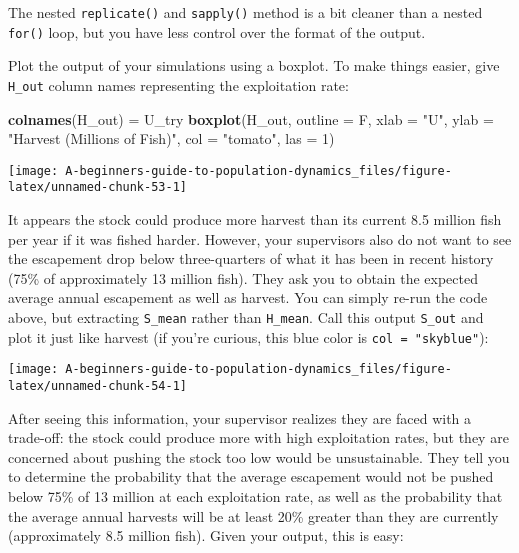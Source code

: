 \documentclass[]{book}
\newenvironment{Shaded}{\begin{snugshade}}{\end{snugshade}}
\newcommand{\DataTypeTok}[1]{\textcolor[rgb]{0.13,0.29,0.53}{#1}}
\newcommand{\DecValTok}[1]{\textcolor[rgb]{0.00,0.00,0.81}{#1}}
\newcommand{\KeywordTok}[1]{\textcolor[rgb]{0.13,0.29,0.53}{\textbf{#1}}}
\newcommand{\NormalTok}[1]{#1}
\newcommand{\StringTok}[1]{\textcolor[rgb]{0.31,0.60,0.02}{#1}}
\begin{document}
The nested \texttt{replicate()} and \texttt{sapply()} method is a bit cleaner than a nested \texttt{for()} loop, but you have less control over the format of the output.

Plot the output of your simulations using a boxplot. To make things easier, give \texttt{H\_out} column names representing the exploitation rate:

\begin{Shaded}
\begin{Highlighting}[]
\KeywordTok{colnames}\NormalTok{(H_out) =}\StringTok{ }\NormalTok{U_try}
\KeywordTok{boxplot}\NormalTok{(H_out, }\DataTypeTok{outline =}\NormalTok{ F,}
        \DataTypeTok{xlab =} \StringTok{"U"}\NormalTok{, }\DataTypeTok{ylab =} \StringTok{"Harvest (Millions of Fish)"}\NormalTok{,}
        \DataTypeTok{col =} \StringTok{"tomato"}\NormalTok{, }\DataTypeTok{las =} \DecValTok{1}\NormalTok{)}
\end{Highlighting}
\end{Shaded}

\begin{center}\texttt{[image: A-beginners-guide-to-population-dynamics\_files/figure-latex/unnamed-chunk-53-1]} \end{center}

It appears the stock could produce more harvest than its current 8.5 million fish per year if it was fished harder. However, your supervisors also do not want to see the escapement drop below three-quarters of what it has been in recent history (75\% of approximately 13 million fish). They ask you to obtain the expected average annual escapement as well as harvest. You can simply re-run the code above, but extracting \texttt{S\_mean} rather than \texttt{H\_mean}. Call this output \texttt{S\_out} and plot it just like harvest (if you're curious, this blue color is \texttt{col\ =\ "skyblue"}):

\begin{center}\texttt{[image: A-beginners-guide-to-population-dynamics\_files/figure-latex/unnamed-chunk-54-1]} \end{center}

After seeing this information, your supervisor realizes they are faced with a trade-off: the stock could produce more with high exploitation rates, but they are concerned about pushing the stock too low would be unsustainable. They tell you to determine the probability that the average escapement would not be pushed below 75\% of 13 million at each exploitation rate, as well as the probability that the average annual harvests will be at least 20\% greater than they are currently (approximately 8.5 million fish). Given your output, this is easy:
\end{document}
